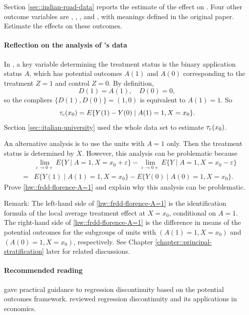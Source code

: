 Section \ref{sec::indian-road-data} reports the estimate of the effect on . Four other outcome variables are , , , and , with meanings defined in the original paper. Estimate the effects on these outcomes. 

 

\paragraph{Reflection on the analysis of \citet{li2015evaluating}'s data}
\label{problem::italy-srd}

In \citet{li2015evaluating}, a key variable determining the treatment status is the binary application status $A$, which has potential outcomes $A(1)$ and $A(0)$ corresponding to the treatment $Z=1$ and control $Z=0$. By definition,
$$
D(1) = A(1), \quad D(0) = 0,
$$
so the compliers $\{ D(1), D(0) \} = (1,0)$ is equivalent to $A(1) = 1$. So 
$$
\tau_{\textup{c}}(x_0) = E\{ Y(1) - Y(0) \mid A(1) = 1, X = x_0 \}. 
$$
Section \ref{sec::italian-university} used the whole data set to estimate $\tau_{\textup{c}}(x_0)$. 

An alternative analysis is to use the units with $A=1$ only. Then the treatment status is determined by $X$. However, this analysis can be problematic because
\begin{eqnarray}
&& \lim_{\varepsilon \rightarrow 0+} E\{ Y \mid A  = 1, X = x_0 + \varepsilon \} -\lim_{\varepsilon \rightarrow 0+}  E\{ Y \mid A  = 1, X = x_0- \varepsilon  \}  \nonumber  \\
&=& E\{ Y(1) \mid A(1)  = 1,   X = x_0   \} -  E\{ Y(0) \mid A(0)  = 1,   X = x_0   \} .\label{hw::frdd-florence-A=1}
\end{eqnarray}
Prove \eqref{hw::frdd-florence-A=1} and explain why this analysis can be problematic.


Remark: 
The left-hand side of \eqref{hw::frdd-florence-A=1} is the identification formula of the local average treatment effect at $X=x_0$, conditional on $A=1$. The right-hand side of \eqref{hw::frdd-florence-A=1} is the difference in means of the potential outcomes for the subgroups of units with $(A(1)  = 1,   X = x_0 )$ and $(A(0)  = 1,   X = x_0)$, respectively. 
See Chapter \ref{chapter::principal-stratification} later for related discussions. 
 


 
 \paragraph{Recommended reading}

\citet{imbens2008regression} gave practical guidance to regression discontinuity based on the potential outcomes framework. \citet{lee2010regression} reviewed regression discontinuity and its applications in economics. 
